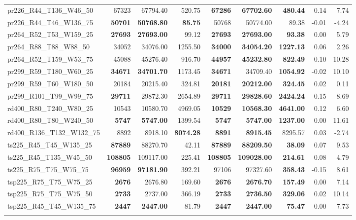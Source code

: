 \documentclass{singlecol-new}
\providecommand{\DIFadd}[1]{{\protect\color{blue}\uwave{#1}}} %
\providecommand{\DIFaddbegin}{} %
\providecommand{\DIFaddend}{} %
\begin{document}
\begin{scriptsize}
\begin{longtable}{lrrrrrrrr}
		pr226\_R44\_T136\_W46\_50 & 67323 & 67794.40 & 520.75 & \textbf{67286} & \textbf{67702.60} & \textbf{480.44} & 0.14 & 7.74 \\
		pr226\_R44\_T46\_W136\_75 & \textbf{50701} & \textbf{50768.80} & \textbf{85.75} & 50768 & 50774.00 & 89.38 & -0.01 & -4.24 \\
		pr264\_R52\_T53\_W159\_25 & \textbf{27693} & \textbf{27693.00} & 99.12 & \textbf{27693} & \textbf{27693.00} & \textbf{93.38} & 0.00 & 5.79 \\
		pr264\_R88\_T88\_W88\_50 & 34052 & 34076.00 & 1255.50 & \textbf{34000} & \textbf{34054.20} & \textbf{1227.13} & 0.06 & 2.26 \\
		pr264\_R52\_T159\_W53\_75 & 45088 & 45276.40 & 916.70 & \textbf{44957} & \textbf{45232.80} & \textbf{822.49} & 0.10 & 10.28 \\
		pr299\_R59\_T180\_W60\_25 & \textbf{34671} & \textbf{34701.70} & 1173.45 & \textbf{34671} & 34709.40 & \textbf{1054.92} & -0.02 & 10.10 \\
		pr299\_R59\_T60\_W180\_50 & 20184 & 20215.40 & 324.81 & \textbf{20181} & \textbf{20212.00} & \textbf{324.45} & 0.02 & 0.11 \\
		pr299\_R101\_T99\_W99\_75 & \textbf{29711} & 29872.30 & 2654.89 & \textbf{29711} & \textbf{29828.60} & \textbf{2424.24} & 0.15 & 8.69 \\
		rd400\_R80\_T240\_W80\_25 & 10543 & 10580.70 & 4969.05 & \textbf{10529} & \textbf{10568.30} & \textbf{4641.00} & 0.12 & 6.60 \\
		rd400\_R80\_T80\_W240\_50 & \textbf{5747} & \textbf{5747.00} & 1399.54 & \textbf{5747} & \textbf{5747.00} & \textbf{1237.00} & 0.00 & 11.61 \\
		rd400\_R136\_T132\_W132\_75 & 8892 & 8918.10 & \textbf{8074.28} & \textbf{8891} & \textbf{8915.45} & 8295.57 & 0.03 & -2.74 \\
		ts225\_R45\_T45\_W135\_25 & \textbf{87889} & 88270.70 & 42.11 & \textbf{87889} & \textbf{88209.50} & \textbf{38.09} & 0.07 & 9.53 \\
		ts225\_R45\_T135\_W45\_50 & \textbf{108805} & 109117.00 & 225.41 & \textbf{108805} & \textbf{109028.00} & \textbf{214.61} & 0.08 & 4.79 \\
		ts225\_R75\_T75\_W75\_75 & \textbf{96959} & \textbf{97181.90} & 392.21 & 97106 & 97327.60 & \textbf{358.43} & -0.15 & 8.61 \\
		tsp225\_R75\_T75\_W75\_25 & \textbf{2676} & 2676.80 & 169.60 & \textbf{2676} & \textbf{2676.70} & \textbf{157.49} & 0.00 & 7.14 \\
		tsp225\_R75\_T75\_W75\_50 & \textbf{2733} & 2737.00 & 366.19 & \textbf{2733} & \textbf{2736.50} & \textbf{329.06} & 0.02 & 10.14 \\
		tsp225\_R45\_T45\_W135\_75 & \textbf{2447} & \textbf{2447.00} & 81.79 & \textbf{2447} & \textbf{2447.00} & \textbf{75.47} & 0.00 & 7.73 \\
		\hline
  \DIFaddbegin \DIFadd{Averages }&  &  &  &  &  &  & \DIFadd{0.007
 }& \DIFadd{5.458
 }\\
		\hline
	\DIFaddend \end{longtable}
\end{scriptsize}
\end{document}
